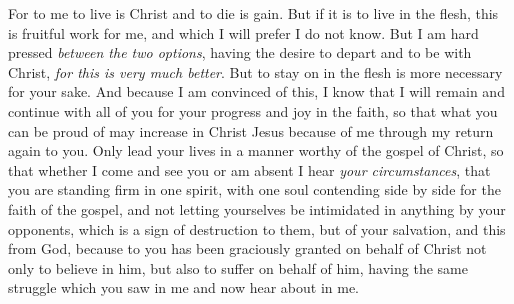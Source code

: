 \begin{biblechapter}
\verse For to me to live is Christ and to die is gain.
\verse But if it is to live in the flesh, this is fruitful work for me, and which I will prefer I do not know.
\verse But I am hard pressed \textit{between the two options}, having the desire to depart and to be with Christ, \textit{for this is very much better}.
\verse But to stay on in the flesh is more necessary for your sake.
\verse And because I am convinced of this, I know that I will remain and continue with all of you for your progress and joy in the faith,
\verse so that what you can be proud of may increase in Christ Jesus because of me through my return again to you.
 Only lead your lives in a manner worthy of the gospel of Christ, so that whether I come and see you or am absent I hear \textit{your circumstances}, that you are standing firm in one spirit, with one soul contending side by side for the faith of the gospel,
\verse and not letting yourselves be intimidated in anything by your opponents, which is a sign of destruction to them, but of your salvation, and this from God,
\verse because to you has been graciously granted on behalf of Christ not only to believe in him, but also to suffer on behalf of him,
\verse having the same struggle which you saw in me and now hear about in me.
\end{biblechapter}

